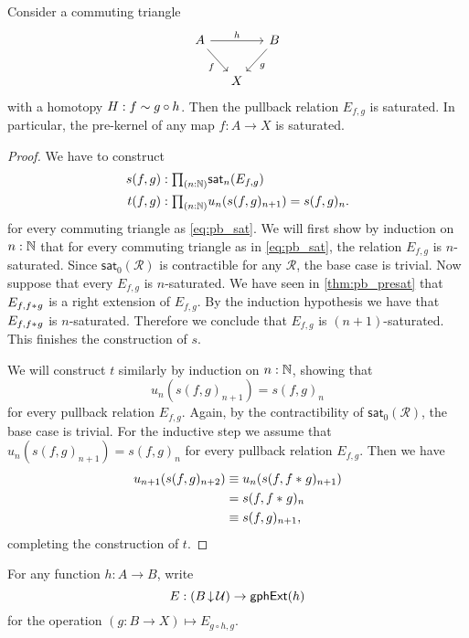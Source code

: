 \begin{thm}\label{thm:pb_sat}
Consider a commuting triangle
\begin{equation}\label{eq:pb_sat}
\begin{tikzcd}[column sep=small]
A \arrow[rr,"h"] \arrow[dr,swap,"f"] & & B \arrow[dl,"g"] \\
& X
\end{tikzcd}
\end{equation}
with a homotopy $H:f\sim g\circ h$. Then the pullback relation $E_{f,g}$ is saturated. In particular, the pre-kernel of any map $f:A\to X$ is saturated.
\end{thm}

\begin{proof}
We have to construct
\begin{align*}
s(f,g) & : \prd{n:\N} \mathsf{sat}_n(E_{f,g}) \\
t(f,g) & : \prd{n:\N} u_n(s(f,g)_{n+1})=s(f,g)_n. 
\end{align*}
for every commuting triangle as \cref{eq:pb_sat}. We will first show by induction on $n:\mathbb{N}$ that for every commuting triangle as in \cref{eq:pb_sat}, the relation $E_{f,g}$ is $n$-saturated. Since $\mathsf{sat}_0(\mathcal{R})$ is contractible for any $\mathcal{R}$, the base case is trivial.
Now suppose that every $E_{f,g}$ is $n$-saturated. We have seen in \cref{thm:pb_presat} that $E_{f,{f}\ast_{}{g}}$ is a right extension of $E_{f,g}$. By the induction hypothesis we have that $E_{f,{f}\ast_{}{g}}$ is $n$-saturated. Therefore we conclude that $E_{f,g}$ is $(n+1)$-saturated. This finishes the construction of $s$.

We will construct $t$ similarly by induction on $n:\mathbb{N}$, showing that 
\begin{equation*}
u_n(s(f,g)_{n+1})=s(f,g)_n
\end{equation*}
for every pullback relation $E_{f,g}$. Again, by the contractibility of $\mathsf{sat}_0(\mathcal{R})$, the base case is trivial. For the inductive step we assume that $u_n(s(f,g)_{n+1})=s(f,g)_n$ for every pullback relation $E_{f,g}$. Then we have
\begin{align*}
u_{n+1}(s(f,g)_{n+2}) & \equiv u_n(s(f,{f}\ast_{}{g})_{n+1}) \\
& = s(f,{f}\ast_{}{g})_n \\
& \equiv s(f,g)_{n+1},
\end{align*}
completing the construction of $t$. 
\end{proof}

For any function $h:A\to B$, write 
\begin{equation*}
E: (B\,{\downarrow}\,\mathcal{U}) \to \mathsf{gphExt}(h)
\end{equation*}
for the operation $(g:B\to X)\mapsto E_{g\circ h,g}$.

